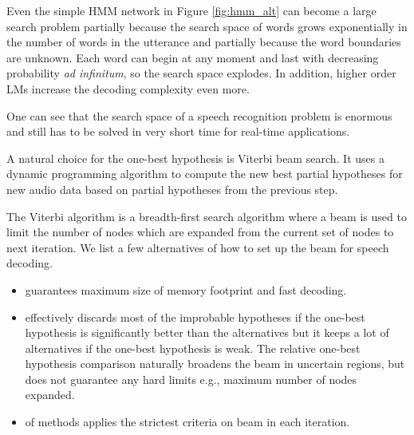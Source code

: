 Even the simple \ac{HMM} network in Figure \ref{fig:hmm_alt} can become a large search problem partially because the search space of words grows exponentially in the number of words in the utterance and partially because the word boundaries are unknown. Each word can begin at any moment and last with decreasing probability \textit{ad infinitum}, so the search space explodes. In addition, higher order \acp{LM} increase the decoding complexity even more.

One can see that the search space of a speech recognition problem is enormous and still has to be solved in very short time for real-time applications. %

A natural choice for the one-best hypothesis is Viterbi beam search\cite{huang2001spoken}. It uses a dynamic programming algorithm to compute the new best partial hypotheses for new audio data based on partial hypotheses from the previous step. 


The Viterbi algorithm is a breadth-first search algorithm where a beam is used to limit the number of nodes which are expanded from the current set of nodes to next iteration. We list a few alternatives of how to set up the beam for speech decoding.

\begin{itemize}
\item {} guarantees maximum size of memory footprint and fast decoding.
\item {} effectively discards most of the improbable hypotheses if the one-best hypothesis is significantly better than the alternatives but it keeps a lot of alternatives if the one-best hypothesis is weak. The relative one-best hypothesis comparison naturally broadens the beam in uncertain regions, but does not guarantee any hard limits e.g., maximum number of nodes expanded.
\item {} of methods applies the strictest criteria on beam in each iteration.
\end{itemize}

